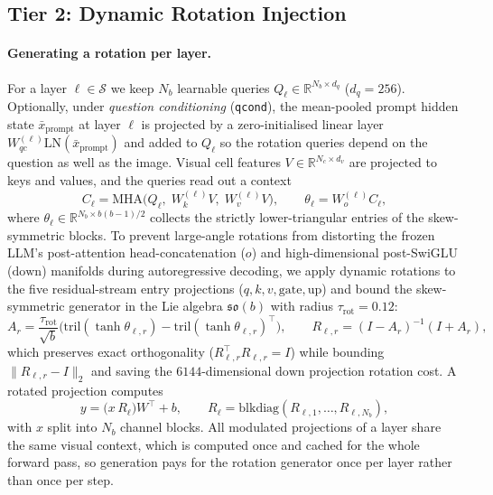 \documentclass[10pt,twocolumn,letterpaper]{article}
\begin{document}
\subsection{Tier 2: Dynamic Rotation Injection}
\label{sec:dynamic}

\paragraph{Generating a rotation per layer.}
For a layer $\ell\in\mathcal{S}$ we keep $N_b$ learnable queries
$Q_\ell\in\mathbb{R}^{N_b\times d_q}$ ($d_q{=}256$). Optionally, under
\emph{question conditioning} (\texttt{qcond}), the mean-pooled prompt hidden
state $\bar x_{\text{prompt}}$ at layer $\ell$ is projected by a
zero-initialised linear layer $W_{qc}^{(\ell)}\mathrm{LN}(\bar x_{\text{prompt}})$
and added to $Q_\ell$ so the rotation queries depend on the question as well as
the image. Visual cell features $V\in\mathbb{R}^{N_c\times d_v}$ are
projected to keys and values, and the queries read out a context
\begin{equation}
C_\ell = \mathrm{MHA}\big(Q_\ell,\; W_k^{(\ell)}V,\; W_v^{(\ell)}V\big),
\qquad
\theta_\ell = W_o^{(\ell)}C_\ell ,
\label{eq:ctx}
\end{equation}
where $\theta_\ell\in\mathbb{R}^{N_b\times b(b-1)/2}$ collects the strictly
lower-triangular entries of the skew-symmetric blocks. To prevent large-angle
rotations from distorting the frozen LLM's post-attention head-concatenation
($o$) and high-dimensional post-SwiGLU ($\text{down}$) manifolds during
autoregressive decoding, we apply dynamic rotations to the five residual-stream
entry projections ($q,k,v,\text{gate},\text{up}$) and bound the skew-symmetric
generator in the Lie algebra $\mathfrak{so}(b)$ with radius
$\tau_{\mathrm{rot}}{=}0.12$:
\begin{equation}
A_r = \frac{\tau_{\mathrm{rot}}}{\sqrt{b}}\Big(\mathrm{tril}(\tanh\theta_{\ell,r}) - \mathrm{tril}(\tanh\theta_{\ell,r})^{\top}\Big),
\qquad
R_{\ell,r} = (I-A_r)^{-1}(I+A_r),
\label{eq:cayley}
\end{equation}
which preserves exact orthogonality ($R_{\ell,r}^{\top}R_{\ell,r}=I$) while
bounding $\|R_{\ell,r}-I\|_2$ and saving the $6144$-dimensional $\text{down}$
projection rotation cost. A rotated projection computes
\begin{equation}
y = \big(x\,R_{\ell}\big)W^{\top}+b,
\qquad
R_\ell = \mathrm{blkdiag}(R_{\ell,1},\dots,R_{\ell,N_b}),
\label{eq:rotlin}
\end{equation}
with $x$ split into $N_b$ channel blocks. All modulated projections of a layer
share the same visual context, which is computed once and cached for the whole
forward pass, so generation pays for the rotation generator once per layer
rather than once per step.
\end{document}
